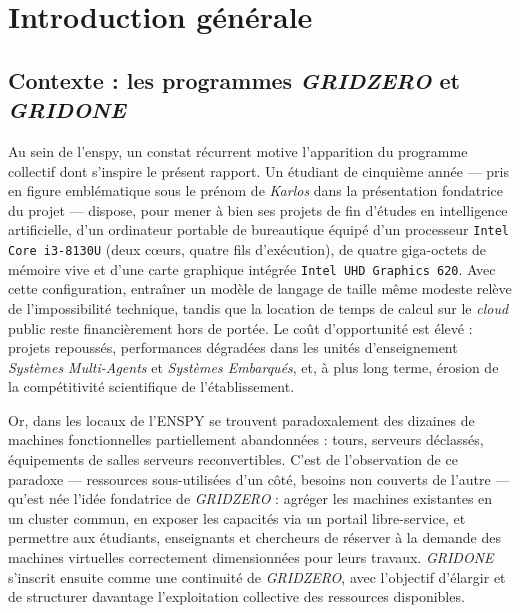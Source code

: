 \chapter*{Introduction générale}

\section*{Contexte : les programmes \emph{GRIDZERO} et \emph{GRIDONE}}

Au sein de l'\acrshort{enspy}, un constat récurrent motive l'apparition du programme collectif dont s'inspire le présent rapport. Un étudiant de cinquième année --- pris en figure emblématique sous le prénom de \emph{Karlos} dans la présentation fondatrice du projet --- dispose, pour mener à bien ses projets de fin d'études en intelligence artificielle, d'un ordinateur portable de bureautique équipé d'un processeur \texttt{Intel Core~i3-8130U} (deux cœurs, quatre fils d'exécution), de quatre giga-octets de mémoire vive et d'une carte graphique intégrée \texttt{Intel UHD Graphics~620}. Avec cette configuration, entraîner un modèle de langage de taille même modeste relève de l'impossibilité technique, tandis que la location de temps de calcul sur le \emph{cloud} public reste financièrement hors de portée. Le coût d'opportunité est élevé : projets repoussés, performances dégradées dans les unités d'enseignement \emph{Systèmes Multi-Agents} et \emph{Systèmes Embarqués}, et, à plus long terme, érosion de la compétitivité scientifique de l'établissement.

Or, dans les locaux de l'ENSPY se trouvent paradoxalement des dizaines de machines fonctionnelles partiellement abandonnées : tours, serveurs déclassés, équipements de salles serveurs reconvertibles. C'est de l'observation de ce paradoxe --- ressources sous-utilisées d'un côté, besoins non couverts de l'autre --- qu'est née l'idée fondatrice de \emph{GRIDZERO} : agréger les machines existantes en un cluster commun, en exposer les capacités via un portail libre-service, et permettre aux étudiants, enseignants et chercheurs de réserver à la demande des machines virtuelles correctement dimensionnées pour leurs travaux. \emph{GRIDONE} s'inscrit ensuite comme une continuité de \emph{GRIDZERO}, avec l'objectif d'élargir et de structurer davantage l'exploitation collective des ressources disponibles.

